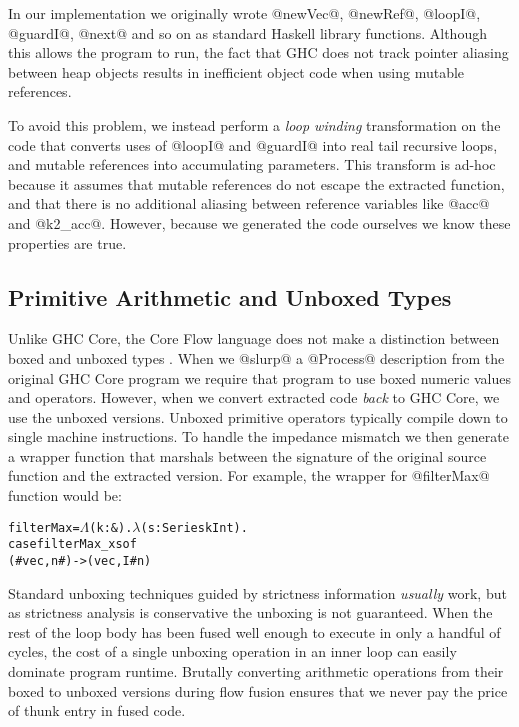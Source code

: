 In our implementation we originally wrote @newVec@, @newRef@, @loopI@, @guardI@, @next@ and so on as standard Haskell library functions. Although this allows the program to run, the fact that GHC does not track pointer aliasing between heap objects results in inefficient object code when using mutable references.

To avoid this problem, we instead perform a \emph{loop winding} transformation on the code that converts uses of @loopI@ and @guardI@ into real tail recursive loops, and mutable references into accumulating parameters. This transform is ad-hoc because it assumes that mutable references do not escape the extracted function, and that there is no additional aliasing between reference variables like @acc@ and @k2_acc@. However, because we generated the code ourselves we know these properties are true. 


\subsection{Primitive Arithmetic and Unboxed Types}
Unlike GHC Core, the Core Flow language does not make a distinction between boxed and unboxed types \cite{PeytonJones:unboxed}. When we @slurp@ a @Process@ description from the original GHC Core program we require that program to use boxed numeric values and operators. However, when we convert extracted code \emph{back} to GHC Core, we use the unboxed versions. Unboxed primitive operators typically compile down to single machine instructions. To handle the impedance mismatch we then generate a wrapper function that marshals between the signature of the original source function and the extracted version. For example, the wrapper for @filterMax@ function would be:

\begin{alltt}
 filterMax = \(\Lambda\)(k : &). \(\lambda\)(s : Series k Int).
             case filterMax_x s of
              (# vec, n #) -> (vec, I# n)
\end{alltt}

Standard unboxing techniques guided by strictness information \emph{usually} work, but as strictness analysis is conservative the unboxing is not guaranteed. When the rest of the loop body has been fused well enough to execute in only a handful of cycles, the cost of a single unboxing operation in an inner loop can easily dominate program runtime. Brutally converting arithmetic operations from their boxed to unboxed versions during flow fusion ensures that we never pay the price of thunk entry in fused code.
 

